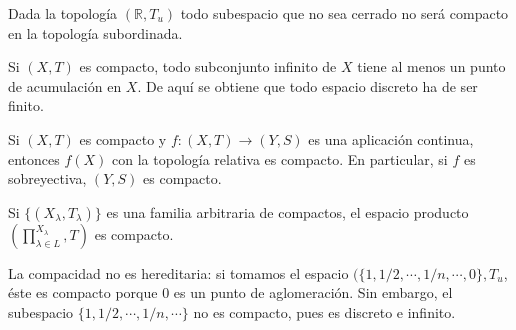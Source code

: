 \documentclass[a4paper, 11pt]{extarticle}
\begin{document}
Dada la topología \((\mathbb{R}, T_u)\) todo subespacio que no sea cerrado no
será compacto en la topología subordinada.

Si \((X,T)\) es compacto, todo subconjunto infinito de \(X\) tiene al menos
un punto de acumulación en \(X\). De aquí se obtiene que todo espacio discreto
ha de ser finito.

Si \((X,T)\) es compacto y \(f:  (X,T) \rightarrow  (Y, S)\) es una
aplicación continua, entonces \(f(X)\) con la topología relativa es compacto.
En particular, si \(f\) es sobreyectiva, \((Y,S)\) es compacto.

Si \(\{ (X_\lambda, T_\lambda) \}\) es una familia arbitraria de compactos, el
espacio producto \((\prod_{\lambda \in L}^{X_\lambda}, T)\) es compacto. 

La compacidad no es hereditaria: si tomamos el espacio \((\{ 1, 1/2, \cdots, 1/n,
\cdots, 0 \},T_u\), éste es compacto porque 0 es un punto de aglomeración. Sin
embargo, el subespacio \(\{ 1, 1/2, \cdots, 1/n, \cdots \}\) no es compacto,
pues es discreto e infinito.
\end{document}
